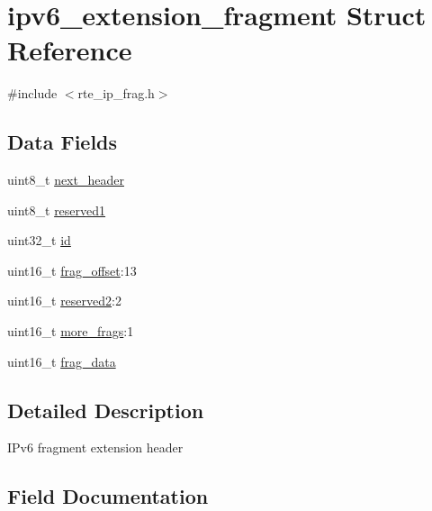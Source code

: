 \hypertarget{structipv6__extension__fragment}{}\section{ipv6\+\_\+extension\+\_\+fragment Struct Reference}
\label{structipv6__extension__fragment}


{\ttfamily \#include $<$rte\+\_\+ip\+\_\+frag.\+h$>$}

\subsection*{Data Fields}
\begin{DoxyCompactItemize}
\item 
uint8\+\_\+t \hyperlink{structipv6__extension__fragment_a045daeeb2d6d7b5c4706eb5ca627e84c}{next\+\_\+header}
\item 
uint8\+\_\+t \hyperlink{structipv6__extension__fragment_a2a2556147677ece60b8aadf4a0d608ed}{reserved1}
\item 
uint32\+\_\+t \hyperlink{structipv6__extension__fragment_abaabdc509cdaba7df9f56c6c76f3ae19}{id}
\item 
uint16\+\_\+t \hyperlink{structipv6__extension__fragment_a9c7421f074a7d377459e48d7b7f33c5a}{frag\+\_\+offset}\+:13
\item 
uint16\+\_\+t \hyperlink{structipv6__extension__fragment_a0fc429b055e74830a4583ec37f5c3846}{reserved2}\+:2
\item 
uint16\+\_\+t \hyperlink{structipv6__extension__fragment_aae811d6ca09a461ef6b1555d6fc9fe00}{more\+\_\+frags}\+:1
\item 
uint16\+\_\+t \hyperlink{structipv6__extension__fragment_a229687a8da9d22dcb913d9112e819fd9}{frag\+\_\+data}
\end{DoxyCompactItemize}


\subsection{Detailed Description}
I\+Pv6 fragment extension header 

\subsection{Field Documentation}
\hypertarget{structipv6__extension__fragment_a229687a8da9d22dcb913d9112e819fd9}{}
